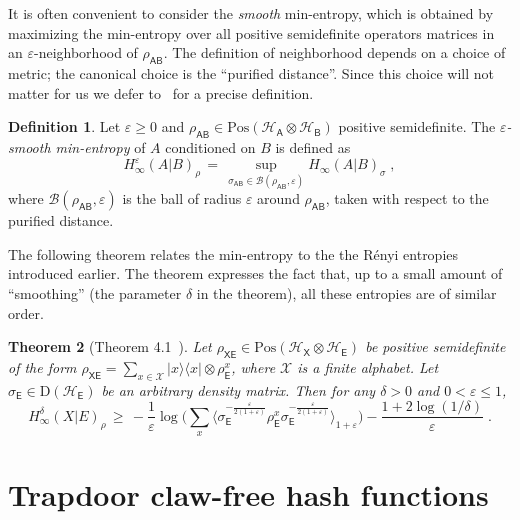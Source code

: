 \documentclass[11pt]{article}
\newtheorem{theorem}{Theorem}
\theoremstyle{remark}
\theoremstyle{definition}
\newtheorem{definition}[theorem]{Definition}
\newcommand{\ket}[1]{|#1\rangle}
\newcommand{\bra}[1]{\langle#1|}
\newcommand{\proj}[1]{\ket{#1}\!\bra{#1}}
\newcommand{\reg}[1]{{\textsf{#1}}}
\newcommand{\mX}{\ensuremath{\mathcal{X}}}
\newcommand{\mH}{\mathcal{H}}
\newcommand{\setft}[1]{\mathrm{#1}}
\newcommand{\Density}{\setft{D}}
\newcommand{\Pos}{\setft{Pos}}
\newcommand{\eps}{\varepsilon}
\newcommand{\Hmin}{H_\infty}
\begin{document}
It is often convenient to consider the \emph{smooth} min-entropy, which is obtained by maximizing the min-entropy over all positive semidefinite operators matrices in an $\eps$-neighborhood of $\rho_\reg{AB}$. The definition of neighborhood depends on a choice of metric; the canonical choice is the ``purified distance''. Since this choice will not matter for us we defer to~\cite{tomamichel2015quantum} for a precise definition.

\begin{definition}\label{prelim:def:smooth-min-entropy}
  Let $\eps \geq 0$ and $\rho_\reg{AB}\in\Pos(\mH_\reg{A}\otimes\mH_\reg{B})$ positive semidefinite. The
  \emph{$\eps$-smooth min-entropy} of $A$ conditioned on $B$ is defined as
  \begin{equation*}
    \Hmin^\eps(A|B)_\rho \,=\, \sup_{\sigma_\reg{AB} \in \mathcal{B}(
      \rho_\reg{AB},\eps) } \Hmin(A|B)_\sigma\;,
  \end{equation*}
	where $\mathcal{B}(
      \rho_\reg{AB},\eps) $ is the ball of radius $\eps$ around $\rho_\reg{AB}$, taken with respect to the purified distance.
\end{definition}

The following theorem relates the min-entropy to the the R\'enyi entropies introduced earlier. The theorem expresses the fact that, up to a small amount of ``smoothing'' (the parameter $\delta$ in the theorem), all these entropies are of similar order. 

\begin{theorem}[Theorem 4.1~\cite{miller2014universal}]\label{thm:ms}
Let $ \rho_{\reg{XE}}\in\Pos(\mH_\reg{X}\otimes \mH_\reg{E}) $ be positive semidefinite of the form $\rho_{\reg{XE}} = \sum_{x\in\mX} \proj{x} \otimes \rho^x_{\reg{E}}$, where $\mX$ is a finite alphabet. Let $\sigma_{\reg{E}}\in\Density(\mH_\reg{E})$ be an arbitrary density matrix. Then for any $\delta >0$ and $0<\eps\leq 1$,
$$ \Hmin^\delta(X|E)_\rho \,\geq\, -\frac{1}{\eps} \log \Big( \sum_x \langle \sigma_{\reg{E}}^{-\frac{\eps}{2(1+\eps)}}\rho_{\reg{E}}^x \sigma_{\reg{E}}^{-\frac{\eps}{2(1+\eps)}} \rangle_{1+\eps} \Big) - \frac{1+2\log(1/\delta)}{\eps}\;.$$
\end{theorem}


\section{Trapdoor claw-free hash functions}
\label{sec:tcf}
\end{document}
